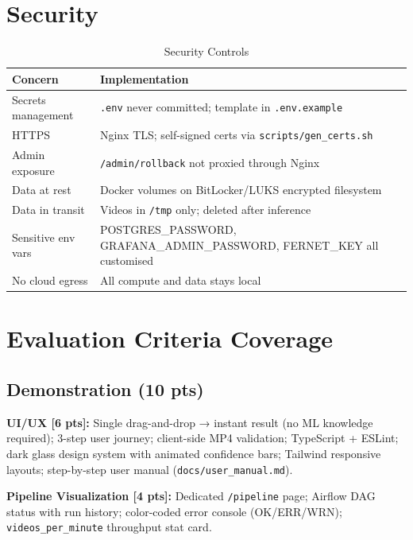 \documentclass[conference]{IEEEtran}
\begin{document}
\section{Security}
\label{sec:security}

\begin{table}[H]
\centering
\caption{Security Controls}
\label{tab:security}
\begin{tabular}{@{}L{2.5cm}L{5cm}@{}}
\toprule
\textbf{Concern} & \textbf{Implementation} \\
\midrule
Secrets management   & \texttt{.env} never committed; template in \texttt{.env.example} \\
HTTPS                & Nginx TLS; self-signed certs via \texttt{scripts/gen\_certs.sh} \\
Admin exposure       & \texttt{/admin/rollback} not proxied through Nginx \\
Data at rest         & Docker volumes on BitLocker/LUKS encrypted filesystem \\
Data in transit      & Videos in \texttt{/tmp} only; deleted after inference \\
Sensitive env vars   & POSTGRES\_PASSWORD, GRAFANA\_ADMIN\_PASSWORD, FERNET\_KEY all customised \\
No cloud egress      & All compute and data stays local \\
\bottomrule
\end{tabular}
\end{table}

\section{Evaluation Criteria Coverage}
\label{sec:eval}

\subsection{Demonstration (10 pts)}

\textbf{UI/UX [6 pts]:} Single drag-and-drop → instant result (no ML knowledge required); 3-step user journey; client-side MP4 validation; TypeScript + ESLint; dark glass design system with animated confidence bars; Tailwind responsive layouts; step-by-step user manual (\texttt{docs/user\_manual.md}).

\textbf{Pipeline Visualization [4 pts]:} Dedicated \texttt{/pipeline} page; Airflow DAG status with run history; color-coded error console (OK/ERR/WRN); \texttt{videos\_per\_minute} throughput stat card.
\end{document}

